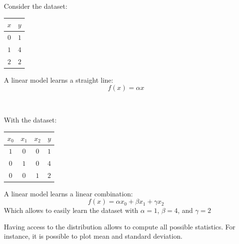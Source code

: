 \begin{description}
\begin{remark}
\begin{example}
                \begin{minipage}[t]{0.3\linewidth}
                    Consider the dataset:
                    \begin{table}[H]
                        \centering
                        \footnotesize
                        \begin{tabular}{c|c}
                            \toprule
                            $x$ & $y$ \\
                            \midrule
                            $0$ & $1$ \\
                            $1$ & $4$ \\
                            $2$ & $2$ \\
                            \bottomrule
                        \end{tabular}
                    \end{table}
                \end{minipage}
                \begin{minipage}[t]{0.65\linewidth}
                    A linear model learns a straight line:
                    \[ f(x) = \alpha x \]
                \end{minipage}\\[1em]
                \begin{minipage}[t]{0.3\linewidth}
                    With the dataset:
                    \begin{table}[H]
                        \centering
                        \footnotesize
                        \begin{tabular}{ccc|c}
                            \toprule
                            $x_0$ & $x_1$ & $x_2$ & $y$ \\
                            \midrule
                            $1$ & $0$ & $0$ & $1$ \\
                            $0$ & $1$ & $0$ & $4$ \\
                            $0$ & $0$ & $1$ & $2$ \\
                            \bottomrule
                        \end{tabular}
                    \end{table}
                \end{minipage}
                \begin{minipage}[t]{0.65\linewidth}
                    A linear model learns a linear combination:
                    \[ f(x) = \alpha x_0 + \beta x_1 + \gamma x_2 \]
                    Which allows to easily learn the dataset with $\alpha=1$, $\beta=4$, and $\gamma=2$
                \end{minipage}
            \end{example}
        \end{remark}

        \begin{remark}
            Having access to the distribution allows to compute all possible statistics. For instance, it is possible to plot mean and standard deviation.
        \end{remark}
\end{description}